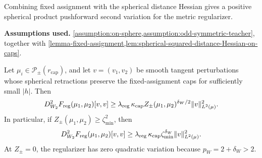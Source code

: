 Combining fixed assignment with the spherical distance Hessian gives a positive spherical product pushforward second variation for the metric regularizer.
\begin{lemma}
\label{lem:W2-power-regularizer-Hessian-on-fixed-caps}
\textbf{Assumptions used.} \cref{assumption:on-sphere,assumption:odd-symmetric-teacher}, together with \cref{lemma-fixed-assignment,lem:spherical-squared-distance-Hessian-on-caps}.

Let \(\mu_i\in\mathcal P_\pm(r_{\mathrm{cap}})\), and let \(v=(v_1,v_2)\) be smooth tangent perturbations whose spherical retractions preserve the fixed-assignment caps for sufficiently small \(|h|\).  Then
\begin{align}
\label{eq:W2-power-Hessian-lower-bound-fixed-caps}
    D^2_{W_2}F_{\mathrm{reg}}(\mu_1,
    \mu_2)[v,v]
    \ge
    \lambda_{\mathrm{reg}}\,
    \kappa_{\mathrm{cap}}
    Z_\pm(\mu_1,
    \mu_2)^{\delta_W/2}
    \|v\|_{L^2(\mu)}^2.
\end{align}
In particular, if \(Z_\pm(\mu_1,
\mu_2)\ge\zeta_{\min}^2\), then
\begin{equation}
\label{eq:W2-power-Hessian-lower-bound-annulus}
    D^2_{W_2}F_{\mathrm{reg}}(
    \mu_1,
    \mu_2)[v,v]
    \ge
    \lambda_{\mathrm{reg}}\,
    \kappa_{\mathrm{cap}}
    \zeta_{\min}^{\delta_W}
    \|v\|_{L^2(\mu)}^2.
\end{equation}
At \(Z_\pm=0\), the regularizer has zero quadratic variation because \(p_W=2+\delta_W>2\).
\end{lemma}


